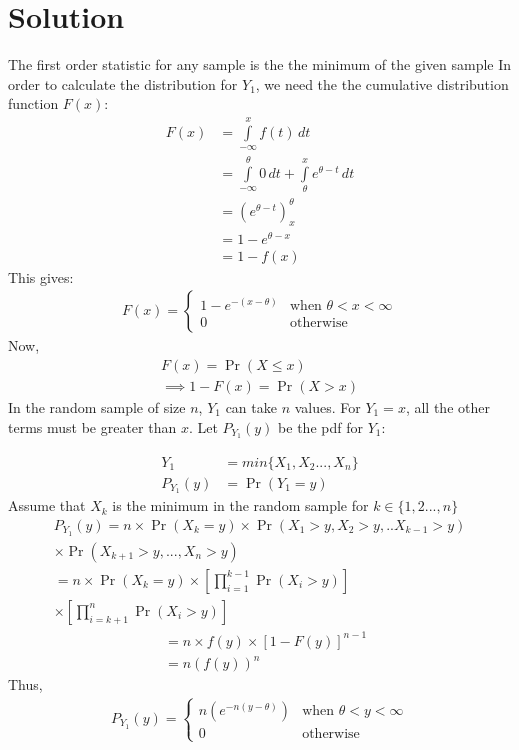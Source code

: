 \documentclass[journal,12pt,twocolumn]{IEEEtran}
\providecommand{\pr}[1]{\ensuremath{\Pr\left(#1\right)}}
\providecommand{\brak}[1]{\ensuremath{\left(#1\right)}}
\theoremstyle{remark}
\numberwithin{equation}{subsection}
\begin{document}
\section{\textbf{Solution}}
The first order statistic for any sample is the the minimum of the given sample 
In order to calculate the distribution for $Y_1$, we need the the cumulative distribution function $F(x)$:\\
\begin{align}
  F(x) &=\displaystyle\int\limits_{-\infty}^{x} f(t) \,dt\\
  &= \displaystyle\int\limits_{-\infty}^{\theta}0\,dt + \displaystyle\int\limits_{\theta}^{x}e^{\theta-t}\,dt\\
  &=\brak{e^{\theta-t}}_{x}^{\theta}\\
  &= 1-e^{\theta-x} \\
  &= 1-f(x)
\end{align}
This gives: 
\begin{align}
    F(x) = 
    \begin{cases}
    1-e^{-(x-\theta)} &\text{when }\theta<x<\infty\\
    0 &\text{otherwise}
    \end{cases}
\end{align}
Now,
\begin{align}
    F(x) = \pr{X\leq x}\\
    \implies 1-F(x) = \pr{X>x}
\end{align}
In the random sample of size $n$, $Y_1$ can take $n$  values. For $Y_1 = x$, all the other terms must be greater than $x$. Let $P_{Y_1}(y)$ be the pdf for $Y_1$:

\begin{align}
    Y_1 &= \textit{min}\{X_1, X_2...,X_n\}\\
    P_{Y_1}(y) &= \pr{Y_1=y}
\end{align}
Assume that $X_k$ is the minimum in the random sample for $k \in \{1,2...,n\}$
\begin{multline}
    P_{Y_1}(y) = n\times\pr{X_k=y} \times\pr{X_1>y, X_2>y,..X_{k-1}>y} \\
    \times\pr{X_{k+1}>y, ..., X_n>y}\\
    = n\times \pr{X_k=y}\times\left[\prod_{i=1}^{k-1}\pr{X_i>y}\right]\\
    \times\left[\prod_{i=k+1}^{n}\pr{X_i>y}\right]\nonumber
\end{multline}
\begin{align}
    &= n\times f(y)\times[1-F(y)]^{n-1}\nonumber\\
    &= n(f(y))^{n}
\end{align}
Thus,
\begin{align}
    P_{Y_1}(y) = \label{eq_1}
    \begin{cases}
    n(e^{-n(y-\theta)})&\text{when }\theta<y<\infty\\
    0 &\text{otherwise }
    \end{cases}
\end{align}
\end{document}
